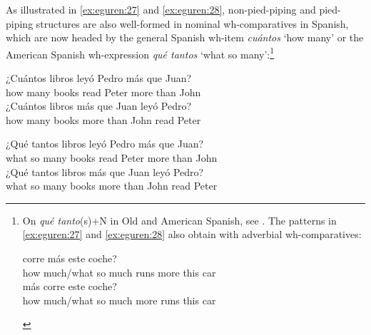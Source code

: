 \documentclass[output=paper,colorlinks,citecolor=brown]{langscibook}
\begin{document}
As illustrated in \ref{ex:eguren:27} and \ref{ex:eguren:28}, non-pied-piping and pied-piping structures are also well-formed in nominal wh-comparatives in Spanish, which are now headed by the general Spanish wh-item \textit{cuántos} `how many' or the American Spanish wh-expression \textit{qué tantos} `what so many':\footnote{On \textit{qué tanto}(s)+N in Old and American Spanish, see \cite{de2006cuantificadores}. The patterns in \ref{ex:eguren:27} and \ref{ex:eguren:28} also obtain with adverbial wh-comparatives:
\begin{exe}
      \ex\label{ex:eguren:fn3}
       \begin{xlist} %
        \ex %
            			corre	más	este	coche?\\   %
            {how much/what so much}	runs	more	 this	car\\
            \ex
            	más	corre	este	coche?\\
            {how much/what so much}	more	runs	this	car\\
\end{xlist}
 \end{exe}
}

\begin{exe} 
    \ex\label{ex:eguren:27} 
    \begin{xlist}
            \ex
\gll ¿Cuántos		libros		leyó	Pedro	más	que	Juan?\\
     {how many}	books	read	Peter		more	than	John\\
            \ex
\gll ¿Cuántos		libros		más	que	Juan	leyó	Pedro?\\
  {how many}	books	more	than	John	read	Peter\\
\end{xlist}
\end{exe}


\begin{exe} 
    \ex\label{ex:eguren:28} 
    \begin{xlist}
            \ex
\gll ¿Qué		tantos		libros		leyó	Pedro	más	que	Juan?\\
   what	{so many}	books read	Peter more	than	John \\
            \ex
\gll ¿Qué		tantos		libros		más	que	Juan	leyó	Pedro?\\
    what {so many}	books	more	than	John	read	Peter\\
\end{xlist}
\end{exe}
\end{document}
